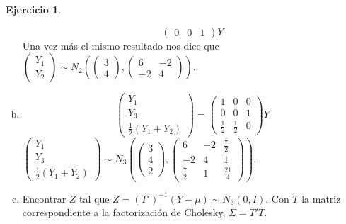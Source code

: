 \documentclass[12pt,spanish]{article}
\theoremstyle{definition}
\newtheorem{exercise}{Ejercicio}
\begin{document}
\begin{exercise}
\begin{enumerate}[a)]
\[\begin{pmatrix}
        0 & 0 & 1
      \end{pmatrix}Y\] Una vez más el mismo resultado nos dice
    que $\begin{pmatrix}
      Y_1 \\
      Y_2
    \end{pmatrix}\sim N_2\left(
      \begin{pmatrix}
        3 \\ 4
      \end{pmatrix},
      \begin{pmatrix}
        6 & -2 \\
        -2 & 4
      \end{pmatrix}\right)$.
  \item \[\begin{pmatrix}
        Y_1 \\
        Y_3 \\
        \frac{1}{2}(Y_1+Y_2)
      \end{pmatrix}
      =\begin{pmatrix}
        1 & 0 & 0 \\
        0 & 0 & 1 \\
        \frac{1}{2} & \frac{1}{2} & 0
      \end{pmatrix}Y\]
    $\begin{pmatrix}
      Y_1 \\
      Y_3 \\
      \frac{1}{2}(Y_1+Y_2)
    \end{pmatrix}\sim N_3\left(
      \begin{pmatrix}
        3 \\ 4 \\ 2
      \end{pmatrix},
      \begin{pmatrix}
        6 & -2 & \frac{7}{2} \\
        -2 & 4 & 1 \\
        \frac{7}{2} & 1 & \frac{21}{4}
      \end{pmatrix}\right)$.
  \item Encontrar $Z$ tal que $Z=(T')^{-1}(Y-\mu)\sim N_3(0,I)$. Con
    $T$ la matriz correspondiente a la factorización de Cholesky,
    $\Sigma=T'T$.


\end{enumerate}
\end{exercise}
\end{document}
